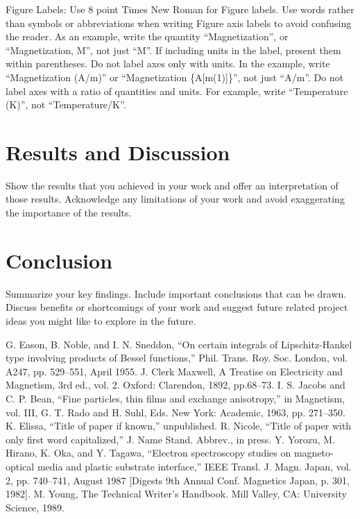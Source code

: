 \documentclass[conference]{IEEEtran}
\begin{document}
Figure Labels: Use 8 point Times New Roman for Figure labels. Use words 
rather than symbols or abbreviations when writing Figure axis labels to 
avoid confusing the reader. As an example, write the quantity 
``Magnetization'', or ``Magnetization, M'', not just ``M''. If including 
units in the label, present them within parentheses. Do not label axes only 
with units. In the example, write ``Magnetization (A/m)'' or ``Magnetization 
\{A[m(1)]\}'', not just ``A/m''. Do not label axes with a ratio of 
quantities and units. For example, write ``Temperature (K)'', not 
``Temperature/K''.

\section{Results and Discussion}
Show the results that you achieved in your work and offer an interpretation of those results. Acknowledge any limitations of your work and avoid exaggerating the importance of the results.

\section{Conclusion}
Summarize your key findings. Include important conclusions that can be drawn. Discuss benefits or shortcomings of your work and suggest future related project ideas you might like to explore in the future.

\begin{thebibliography}{00}
 G. Eason, B. Noble, and I. N. Sneddon, ``On certain integrals of Lipschitz-Hankel type involving products of Bessel functions,'' Phil. Trans. Roy. Soc. London, vol. A247, pp. 529--551, April 1955.
 J. Clerk Maxwell, A Treatise on Electricity and Magnetism, 3rd ed., vol. 2. Oxford: Clarendon, 1892, pp.68--73.
 I. S. Jacobs and C. P. Bean, ``Fine particles, thin films and exchange anisotropy,'' in Magnetism, vol. III, G. T. Rado and H. Suhl, Eds. New York: Academic, 1963, pp. 271--350.
 K. Elissa, ``Title of paper if known,'' unpublished.
 R. Nicole, ``Title of paper with only first word capitalized,'' J. Name Stand. Abbrev., in press.
 Y. Yorozu, M. Hirano, K. Oka, and Y. Tagawa, ``Electron spectroscopy studies on magneto-optical media and plastic substrate interface,'' IEEE Transl. J. Magn. Japan, vol. 2, pp. 740--741, August 1987 [Digests 9th Annual Conf. Magnetics Japan, p. 301, 1982].
 M. Young, The Technical Writer's Handbook. Mill Valley, CA: University Science, 1989.
\end{thebibliography}
\end{document}
